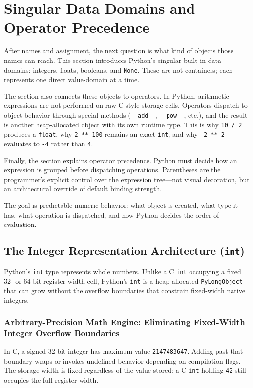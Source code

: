 \documentclass[a4paper,twoside]{report}
\begin{document}
\section{Singular Data Domains and Operator Precedence}

After names and assignment, the next question is what kind of objects those names can reach. This section introduces Python's singular built-in data domains: integers, floats, booleans, and \texttt{None}. These are not containers; each represents one direct value-domain at a time.

The section also connects these objects to operators. In Python, arithmetic expressions are not performed on raw C-style storage cells. Operators dispatch to object behavior through special methods (\texttt{\_\_add\_\_}, \texttt{\_\_pow\_\_}, etc.), and the result is another heap-allocated object with its own runtime type. This is why \texttt{10 / 2} produces a \texttt{float}, why \texttt{2 ** 100} remains an exact \texttt{int}, and why \texttt{-2 ** 2} evaluates to \texttt{-4} rather than \texttt{4}.

Finally, the section explains operator precedence. Python must decide how an expression is grouped before dispatching operations. Parentheses are the programmer's explicit control over the expression tree---not visual decoration, but an architectural override of default binding strength.

The goal is predictable numeric behavior: what object is created, what type it has, what operation is dispatched, and how Python decides the order of evaluation.


\subsection{The Integer Representation Architecture (\texttt{int})}

Python's \texttt{int} type represents whole numbers. Unlike a C \texttt{int} occupying a fixed 32- or 64-bit register-width cell, Python's \texttt{int} is a heap-allocated \texttt{PyLongObject} that can grow without the overflow boundaries that constrain fixed-width native integers.

\subsubsection{Arbitrary-Precision Math Engine: Eliminating Fixed-Width Integer Overflow Boundaries}

In C, a signed 32-bit integer has maximum value \texttt{2147483647}. Adding past that boundary wraps or invokes undefined behavior depending on compilation flags. The storage width is fixed regardless of the value stored: a C \texttt{int} holding \texttt{42} still occupies the full register width.
\end{document}
